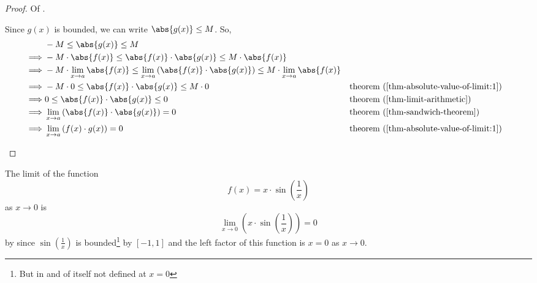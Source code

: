 \begin{proof}
    Of .
    \begin{flushleft}
        Since $g(x)$ is bounded, we can write $\abs{g(x)} \leq M$. So,
        \begin{align*}
            &-M \leq \abs{g(x)} \leq M\\
            \implies
            &-M\cdot\abs{f(x)} \leq \abs{f(x)}\cdot\abs{g(x)} \leq M\cdot \abs{f(x)}\\
            \implies
            &-M\cdot \lim_{x \to a}\abs{f(x)} \leq  \lim_{x \to a}\left(\abs{f(x)}\cdot\abs{g(x)}\right) \leq M \cdot \lim_{x \to a}\abs{f(x)}\\
            \implies
            &-M \cdot 0 \leq \abs{f(x)}\cdot\abs{g(x)} \leq M \cdot 0 && \text{\pref{theorem}{thm-absolute-value-of-limit:1}} \\
            \implies
            & 0 \leq \abs{f(x)}\cdot\abs{g(x)} \leq 0 && \text{\pref{theorem}{thm-limit-arithmetic}}\\
            \implies
            &\lim_{x \to a}\left(\abs{f(x)}\cdot\abs{g(x)}\right)=0 && \text{\pref{theorem}{thm-sandwich-theorem}}\\
            \implies
            &\lim_{x \to a}\left(f(x)\cdot g(x)\right)=0 && \text{\pref{theorem}{thm-absolute-value-of-limit:1}} \\
        \end{align*}
    \end{flushleft}
\end{proof}

\begin{exm}
    The limit of the function 
    \begin{equation*}
        f(x) = x\cdot\sin\left(\frac{1}{x}\right)
    \end{equation*}
    as $x \to 0$ is
    \begin{equation*}
        \lim_{x \to 0}\left(x\cdot\sin\left(\frac{1}{x}\right)\right)=0
    \end{equation*}
    by  since $\sin\left(\tfrac{1}{x}\right)$
    is bounded\footnote{But in and of itself not defined at $x=0$} by $[-1,1]$ 
    and the left factor of this function is $x=0$ as $x \to 0$.
\end{exm}

